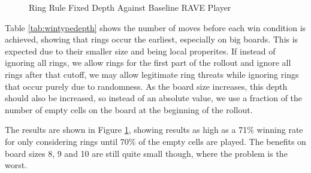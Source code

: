 \begin{figure}
	\centering
{}
	\caption{Ring Rule Fixed Depth Against Baseline RAVE Player}
	\label{fig:ringdepth}
\end{figure}

Table \ref{tab:wintypedepth} shows the number of moves before each win condition is achieved, showing that rings occur the earliest, especially on big boards. This is expected due to their smaller size and being local properites. If instead of ignoring all rings, we allow rings for the first part of the rollout and ignore all rings after that cutoff, we may allow legitimate ring threats while ignoring rings that occur purely due to randomness. As the board size increases, this depth should also be increased, so instead of an absolute value, we use a fraction of the number of empty cells on the board at the beginning of the rollout.

The results are shown in Figure \ref{fig:ringdepth}, showing results as high as a 71\% winning rate for only considering rings until 70\% of the empty cells are played. The benefits on board sizes 8, 9 and 10 are still quite small though, where the problem is the worst.


